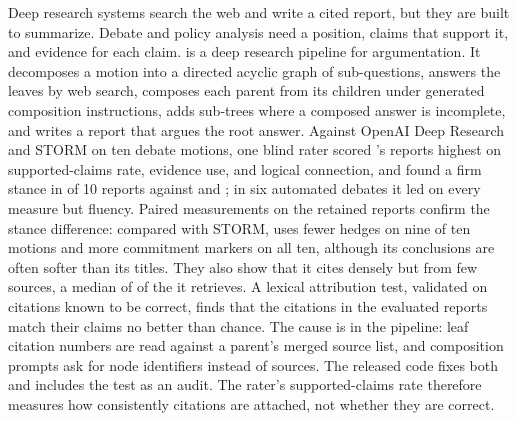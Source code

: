 Deep research systems search the web and write a cited report, but they are built to summarize. Debate and policy analysis need a position, claims that support it, and evidence for each claim. \sys{} is a deep research pipeline for argumentation. It decomposes a motion into a directed acyclic graph of sub-questions, answers the leaves by web search, composes each parent from its children under generated composition instructions, adds sub-trees where a composed answer is incomplete, and writes a report that argues the root answer. Against OpenAI Deep Research and STORM on ten debate motions, one blind rater scored \sys{}'s reports highest on supported-claims rate, evidence use, and logical connection, and found a firm stance in \humStanceDC{} of 10 reports against \humStanceOAI{} and \humStanceStorm{}; in six automated debates it led on every measure but fluency. Paired measurements on the retained reports confirm the stance difference: compared with STORM, \sys{} uses fewer hedges on nine of ten motions and more commitment markers on all ten, although its conclusions are often softer than its titles. They also show that it cites densely but from few sources, a median of \txSourcesDc{} of the \bibMedDc{} it retrieves. A lexical attribution test, validated on citations known to be correct, finds that the citations in the evaluated reports match their claims no better than chance. The cause is in the pipeline: leaf citation numbers are read against a parent's merged source list, and composition prompts ask for node identifiers instead of sources. The released code fixes both and includes the test as an audit. The rater's supported-claims rate therefore measures how consistently citations are attached, not whether they are correct.
